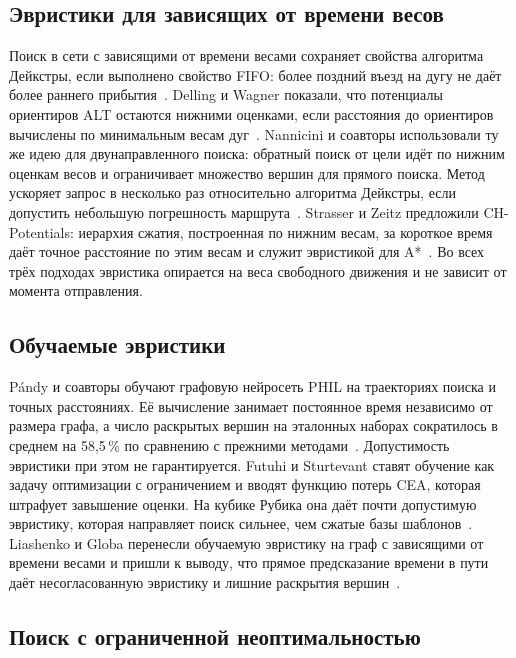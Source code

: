 \documentclass{misisarticle}
\begin{document}
\subsection{Эвристики для зависящих от времени весов}

Поиск в сети с зависящими от времени весами сохраняет свойства алгоритма Дейкстры, если выполнено свойство FIFO: более поздний въезд на дугу не даёт более раннего прибытия~\cite{kaufman1993}. Delling и Wagner показали, что потенциалы ориентиров ALT остаются нижними оценками, если расстояния до ориентиров вычислены по минимальным весам дуг~\cite{delling2007}. Nannicini и соавторы использовали ту же идею для двунаправленного поиска: обратный поиск от цели идёт по нижним оценкам весов и ограничивает множество вершин для прямого поиска. Метод ускоряет запрос в несколько раз относительно алгоритма Дейкстры, если допустить небольшую погрешность маршрута~\cite{nannicini2012}. Strasser и Zeitz предложили CH-Potentials: иерархия сжатия, построенная по нижним весам, за короткое время даёт точное расстояние по этим весам и служит эвристикой для A*~\cite{strasser2019}. Во всех трёх подходах эвристика опирается на веса свободного движения и не зависит от момента отправления.

\subsection{Обучаемые эвристики}

Pándy и соавторы обучают графовую нейросеть PHIL на траекториях поиска и точных расстояниях. Её вычисление занимает постоянное время независимо от размера графа, а число раскрытых вершин на эталонных наборах сократилось в среднем на 58,5\,\% по сравнению с прежними методами~\cite{pandy2022}. Допустимость эвристики при этом не гарантируется. Futuhi и Sturtevant ставят обучение как задачу оптимизации с ограничением и вводят функцию потерь CEA, которая штрафует завышение оценки. На кубике Рубика она даёт почти допустимую эвристику, которая направляет поиск сильнее, чем сжатые базы шаблонов~\cite{futuhi2025}. Liashenko и Globa перенесли обучаемую эвристику на граф с зависящими от времени весами и пришли к выводу, что прямое предсказание времени в пути даёт несогласованную эвристику и лишние раскрытия вершин~\cite{liashenko2026}.

\subsection{Поиск с ограниченной неоптимальностью}
\end{document}
